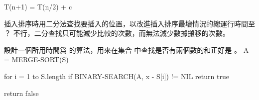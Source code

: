 \startformula
T(n+1) = T(n/2) + c
\stopformula
\stopANSWER

\startEXERCISE
插入排序時用二分法查找要插入的位置，以改進插入排序最壞情況的總運行時間至 ？
\stopEXERCISE
\startANSWER
不行，二分查找只可能減少比較的次數，而無法減少數據搬移的次數。
\stopANSWER

\startEXERCISE
設計一個所用時間爲  的算法，用來在集合  中查找是否有兩個數的和正好是 。
\stopEXERCISE
\startANSWER
{}
\startCLRS
A = MERGE-SORT(S)

for i = 1 to S.length
	if BINARY-SEARCH(A, x - S[i]) != NIL
		return true

return false
\stopCLRS
\stopANSWER

\stopsection
